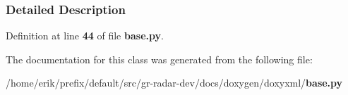 \subsubsection{Detailed Description}


Definition at line {\bf 44} of file {\bf base.\+py}.



The documentation for this class was generated from the following file\+:\begin{DoxyCompactItemize}
\item 
/home/erik/prefix/default/src/gr-\/radar-\/dev/docs/doxygen/doxyxml/{\bf base.\+py}\end{DoxyCompactItemize}
